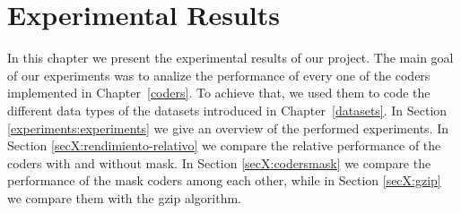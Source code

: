 
\chapter{Experimental Results} %

\label{experiments} %


\newcommand{\maskalgo}{\textit{M}}
\newcommand{\NOmaskalgo}{\textit{NM}}
\newcommand{\coder}{\textit{c}}
\newcommand{\difrelativa}{\textit{RD}}
\newcommand{\tasacompresion}{\textit{CR}}
\newcommand{\nmbits}{\NOmaskalgo_{\textit{S}}}
\newcommand{\mbits}{\maskalgo_\textit{S}}
\newcommand{\cmaskalgo}{$c_\maskalgo$}
\newcommand{\cNOmaskalgo}{$c_\NOmaskalgo$}
\newcommand{\ca}{\textit{CA}}
\newcommand{\algo}{\textit{a}}




In this chapter we present the experimental results of our project. The main goal of our experiments was to analize the performance of every one of the coders implemented in Chapter~\ref{coders}. To achieve that, we used them to code the different data types of the datasets introduced in Chapter~\ref{datasets}. In Section \ref{experiments:experiments} we give an overview of the performed experiments. In Section \ref{secX:rendimiento-relativo} we compare the relative performance of the coders with and without mask. In Section \ref{secX:codersmask} we compare the performance of the mask coders among each other, while in Section \ref{secX:gzip} we compare them with the gzip algorithm.











